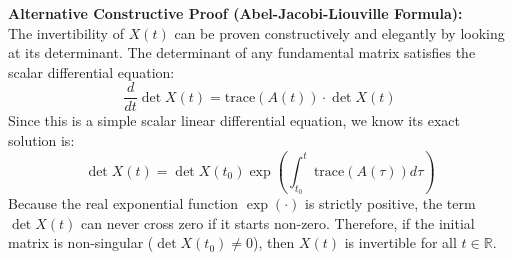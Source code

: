 \documentclass[twoside]{article}
\begin{document}
\vspace{6pt}
\begin{mdframed}[backgroundcolor=green!5, linecolor=green!30!black, roundcorner=5pt]
\textbf{Alternative Constructive Proof (Abel-Jacobi-Liouville Formula):} \\
The invertibility of $X(t)$ can be proven constructively and elegantly by looking at its determinant. The determinant of any fundamental matrix satisfies the scalar differential equation:
\begin{equation*}
    \frac{d}{dt} \det X(t) = \mathrm{trace}(A(t)) \cdot \det X(t)
\end{equation*}
Since this is a simple scalar linear differential equation, we know its exact solution is:
\begin{equation*}
    \det X(t) = \det X(t_0) \exp \left( \int_{t_0}^t \mathrm{trace}(A(\tau)) d\tau \right)
\end{equation*}
Because the real exponential function $\exp(\cdot)$ is strictly positive, the term $\det X(t)$ can never cross zero if it starts non-zero. Therefore, if the initial matrix is non-singular ($\det X(t_0) \neq 0$), then $X(t)$ is invertible for all $t \in \mathbb{R}$.
\end{mdframed}
\vspace{6pt}
\end{document}
